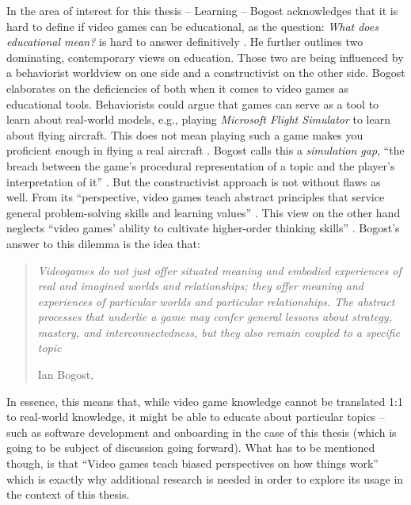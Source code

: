 In the area of interest for this thesis -- Learning -- Bogost acknowledges that it is hard to define if video games can be educational, as the question: \textit{What does educational mean?} is hard to answer definitively \cite[p. 233]{bogost2007persuasive}. He further outlines two dominating, contemporary views on education. Those two are being influenced by a behaviorist worldview on one side and a constructivist on the other side. Bogost elaborates on the deficiencies of both when it comes to video games as educational tools. Behaviorists could argue that games can serve as a tool to learn about real-world models, e.g., playing \textit{Microsoft Flight Simulator} to learn about flying aircraft. This does not mean playing such a game makes you proficient enough in flying a real aircraft \cite[p. 238]{bogost2007persuasive}. Bogost calls this a \textit{simulation gap}, \enquote{the breach between the game's procedural representation of a topic and the player's interpretation of it} \cite[p. 238-239]{bogost2007persuasive}. But the constructivist approach is not without flaws as well. From its \enquote{perspective, video games teach abstract principles that service general problem-solving skills and learning values} \cite[p. 239]{bogost2007persuasive}. This view on the other hand neglects \enquote{video games’ ability to cultivate higher-order thinking skills} \cite[p. 240]{bogost2007persuasive}. Bogost's answer to this dilemma is the idea that:

\begin{quote}
  \textit{Videogames do not just offer situated meaning and embodied experiences of real and imagined worlds and relationships; they offer meaning and experiences of particular worlds and particular relationships. The abstract processes that underlie a game may confer general lessons about strategy, mastery, and interconnectedness, but they also remain coupled to a specific topic}

  \footnotesize{Ian Bogost, \cite[p. 241]{bogost2007persuasive}}
\end{quote}

In essence, this means that, while video game knowledge cannot be translated 1:1 to real-world knowledge, it might be able to educate about particular topics -- such as software development and onboarding in the case of this thesis (which is going to be subject of discussion going forward). What has to be mentioned though, is that \enquote{Video games teach biased perspectives on how things work} \cite[p. 260]{bogost2007persuasive} which is exactly why additional research is needed in order to explore its usage in the context of this thesis.

